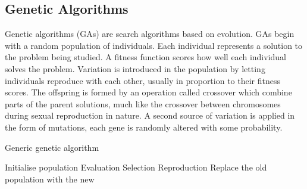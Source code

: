 
\subsection{Genetic Algorithms}
\newline
{}
\newline
Genetic algorithms (GAs) are search algorithms based on evolution. GAs begin with
a random population of individuals. Each individual represents a solution to the problem being
studied. A fitness function scores how well each individual solves the problem. Variation is introduced 
in the population by letting individuals reproduce with each other, usually in proportion to their fitness 
scores. The offspring is formed by an operation called crossover which combine parts of the parent solutions, 
much like the crossover between chromosomes during sexual reproduction in nature. A second source of variation
is applied in the form of mutations, each gene is randomly altered with some probability.


\begin{algorithm}[H]
    \caption{Generic genetic algorithm}
    \begin{algorithmic}

    \State Initialise population
        \State Evaluation 
        \State Selection  
        \State Reproduction 
        \State Replace the old population with the new
    \EndWhile
\EndProcedure

\end{algorithmic}
\end{algorithm}

